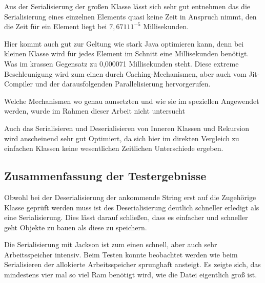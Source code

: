 Aus der Serialisierung der gro\ss{}en Klasse l\"asst sich sehr gut entnehmen das die Serialisierung eines einzelnen Elements quasi keine Zeit in Anspruch nimmt, den die Zeit f\"ur ein Element liegt bei $7,67111^{-5}$ Millisekunden. 

Hier kommt auch gut zur Geltung wie stark Java optimieren kann, denn bei kleinen Klasse wird f\"ur jedes Element im Schnitt eine Millisekunden ben\"otigt. Was im krassen Gegensatz zu 0,000071 Millisekunden steht. Diese extreme Beschleunigung wird zum einen durch Caching-Mechanismen, aber auch vom Jit-Compiler und der darausfolgenden Parallelisierung hervorgerufen. 

Welche Mechanismen wo genau aunsetzten und wie sie im speziellen Angewendet werden, wurde im Rahmen dieser Arbeit nicht untersucht

Auch das Serialisieren und Deserialisieren von Inneren Klassen und Rekursion wird anscheinend sehr gut Optimiert, da sich hier im direkten Vergleich zu einfachen Klassen keine wesentlichen Zeitlichen Unterschiede ergeben.

\subsection{Zusammenfassung der Testergebnisse}
Obwohl bei der Deserialisierung der ankommende String erst auf die Zugeh\"orige Klasse gepr\"uft werden muss ist des Deserialisierung deutlich schneller erledigt als eine Serialisierung. Dies l\"asst darauf schlie\ss{}en, dass es einfacher und schneller geht Objekte zu bauen als diese zu speichern.

Die Serialisierung mit Jackson ist zum einen schnell, aber auch sehr Arbeitsspeicher intensiv. Beim Testen konnte beobachtet werden wie beim Serialisieren der allokierte Arbeitsspeicher sprunghaft ansteigt. Es zeigte sich, das mindestens vier mal so viel Ram ben\"otigt wird, wie die Datei eigentlich gro\ss{} ist. 






